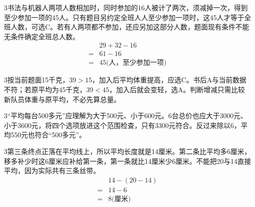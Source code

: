 \documentclass[multi=snippet,border={5bp 20bp 5bp 5bp}]{standalone}
\newenvironment{snippet}[3]{\begin{minipage}{#1bp}\color{answerred}\fontsize{#2}{#3}\selectfont\raggedright}{\end{minipage}}
\begin{document}
\begin{snippet}{505}{11.5}{14}\begin{multicols}{3}\raggedcolumns 书法与机器人两项人数相加时，同时参加的16人被计了两次，须减掉一次，得到至少参加一项的45人。只有题目另约定全班人人至少参加一项时，这45人才等于全班人数，可选C。若有人两项都不参加，还应另加这部分人数，题面现有条件不能无条件确定全班总人数。\[\begin{aligned}&29+32-16\\={}&61-16\\={}&45\text{(人，至少参加一项)}\end{aligned}\]\end{multicols}\end{snippet}
\begin{snippet}{505}{11.5}{14}\begin{multicols}{3}\raggedcolumns 按当前题面15千克，\(39>15\)\allowbreak ，加入后平均体重提高，应选C。书后A与当前数据不符；若原平均为45千克，\(39<45\)\allowbreak ，加入后就会变轻，选A。判断增减只需比较新队员体重与原平均，不必先算总量。\end{multicols}\end{snippet}
\begin{snippet}{505}{11.5}{14}\begin{multicols}{3}\raggedcolumns “平均每台500多元”应理解为大于500元、小于600元。6台总价也应大于3000元、小于3600元，将四个选项放进这个范围检查，只有3300元符合。反过来除以6，平均550元也符合“500多元”。\end{multicols}\end{snippet}
\begin{snippet}{505}{11.5}{14}\begin{multicols}{3}\raggedcolumns 第三条终点正落在平均线上，所以平均长度就是14厘米。第二条比平均多6厘米，移多补少时这6厘米应补给第一条，第一条就比14厘米少6厘米。不能把20与14直接平均，因为实际共有三条丝带。\[\begin{aligned}&14-(20-14)\\={}&14-6\\={}&8\text{(厘米)}\end{aligned}\]\end{multicols}\end{snippet}
\end{document}
